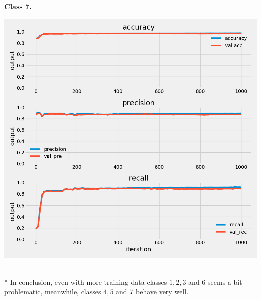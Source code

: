 \documentclass{article}
\begin{document}
\begin{multicols}{2}
	\begin{minipage}[t]{1\columnwidth}
	\begin{center}
	\textbf{Class 7.}\par\medskip
	\includegraphics[width=0.9\columnwidth]{../images/best_predictor_class_7_cross_val_1.png}
	\label{best}
	\end{center}
	\end{minipage}
	\text{ }
	\\*
	In conclusion, even with more training data classes $1,2,3$ and $6$ seems a bit problematic, 
	meanwhile, classes $4,5$ and $7$ behave very well. 

\end{multicols}
\end{document}
